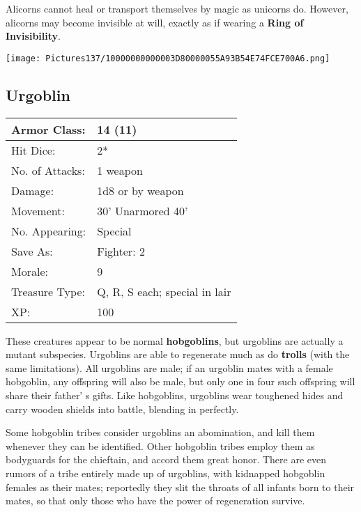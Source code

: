 \documentclass[a4paper,twoside,openany,10pt]{book}
\begin{document}
\begin{multicols}{2}
Alicorns cannot heal or transport themselves by magic as unicorns do. However, alicorns may become invisible at will, exactly as if wearing a \textbf{Ring of Invisibility}.

\begin{center} \texttt{[image: Pictures137/10000000000003D80000055A93B54E74FCE700A6.png]} \end{center}


\subsection*{Urgoblin}\label{urgoblin}

\begin{tabularx}{0.50\textwidth}{@{}lX@{}}
Armor Class: & 14 (11) \\\hline
Hit Dice: & 2* \\\hline
No. of Attacks: & 1 weapon \\\hline
Damage: & 1d8 or by weapon \\\hline
Movement: & 30' Unarmored 40' \\\hline
No. Appearing: & Special \\\hline
Save As: & Fighter: 2 \\\hline
Morale: & 9 \\\hline
Treasure Type: & Q, R, S each; special in lair \\\hline
XP: & 100 \\\hline
\end{tabularx}\medskip

These creatures appear to be normal \textbf{hobgoblins}, but urgoblins are actually a mutant subspecies. Urgoblins are able to regenerate much as do \textbf{trolls} (with the same limitations). All urgoblins are male; if an urgoblin mates with a female hobgoblin, any offspring will also be male, but only one in four such offspring will share their father' s gifts. Like hobgoblins, urgoblins wear toughened hides and carry wooden shields into battle, blending in perfectly.

Some hobgoblin tribes consider urgoblins an abomination, and kill them whenever they can be identified. Other hobgoblin tribes employ them as bodyguards for the chieftain, and accord them great honor. There are even rumors of a tribe entirely made up of urgoblins, with kidnapped hobgoblin females as their mates; reportedly they slit the throats of all infants born to their mates, so that only those who have the power of regeneration survive.


\end{multicols}
\end{document}
